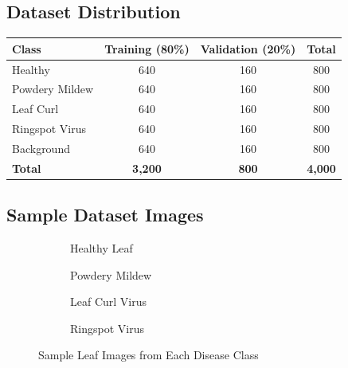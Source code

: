 \documentclass[12pt,a4paper]{report}
\begin{document}
\subsection{Dataset Distribution}
\begin{center}
\begin{tabular}{|l|c|c|c|}
\hline
\textbf{Class} & \textbf{Training (80\%)} & \textbf{Validation (20\%)} & \textbf{Total} \\
\hline
Healthy & 640 & 160 & 800 \\
Powdery Mildew & 640 & 160 & 800 \\
Leaf Curl & 640 & 160 & 800 \\
Ringspot Virus & 640 & 160 & 800 \\
Background & 640 & 160 & 800 \\
\hline
\textbf{Total} & \textbf{3,200} & \textbf{800} & \textbf{4,000} \\
\hline
\end{tabular}
\end{center}

\subsection{Sample Dataset Images}

\begin{figure}[h!]
\centering
\begin{subfigure}[b]{0.22\textwidth}
    \caption{Healthy Leaf}
\end{subfigure}
\hfill
\begin{subfigure}[b]{0.22\textwidth}
    \caption{Powdery Mildew}
\end{subfigure}
\hfill
\begin{subfigure}[b]{0.22\textwidth}
    \caption{Leaf Curl Virus}
\end{subfigure}
\hfill
\begin{subfigure}[b]{0.22\textwidth}
    \caption{Ringspot Virus}
\end{subfigure}
\caption{Sample Leaf Images from Each Disease Class}
\label{fig:dataset_samples}
\end{figure}
\end{document}
